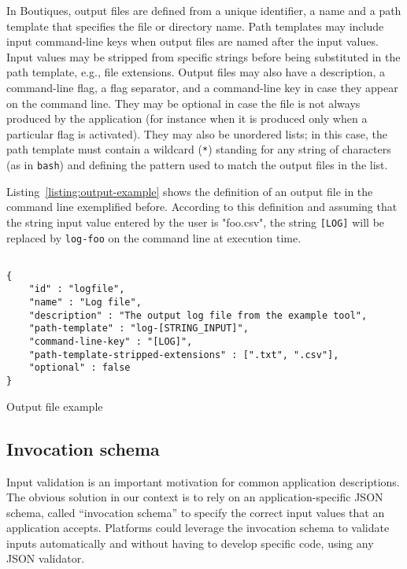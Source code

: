 \documentclass{article}
\begin{document}
In Boutiques, output files are defined from a unique identifier, a
name and a path template that specifies the file or directory
name. Path templates may include input command-line keys when output
files are named after the input values. Input values may be stripped
from specific strings before being substituted in the path template,
e.g., file extensions. Output files may also have a description, a
command-line flag, a flag separator, and a command-line key in case
they appear on the command line. They may be optional in case the file
is not always produced by the application (for instance when it is
produced only when a particular flag is activated). They may also be
unordered lists; in this case, the path template must contain a
wildcard (\texttt{*}) standing for any string of characters (as in
\texttt{bash}) and defining the pattern used to match the output files
in the list.

Listing~\ref{listing:output-example} shows the definition of an output
file in the command line exemplified before. According to this
definition and assuming that the string input value entered by the
user is "foo.csv", the string \texttt{[LOG]} will be
replaced by \texttt{log-foo} on the command line at execution time.

\begin{listing}
\begin{verbatim}

{
    "id" : "logfile",
    "name" : "Log file",
    "description" : "The output log file from the example tool",
    "path-template" : "log-[STRING_INPUT]",
    "command-line-key" : "[LOG]",
    "path-template-stripped-extensions" : [".txt", ".csv"],
    "optional" : false
}
\end{verbatim}
\caption{Output file example} 
\label{listing:output-example}
\end{listing}

\subsection{Invocation schema}
\label{sec:invocation-schema}

Input validation is an important motivation for common application
descriptions. The obvious solution in our context is to rely on an
application-specific JSON schema, called ``invocation schema'' to
specify the correct input values that an application
accepts. Platforms could leverage the invocation schema to validate
inputs automatically and without having to develop specific code,
using any JSON validator.
\end{document}
